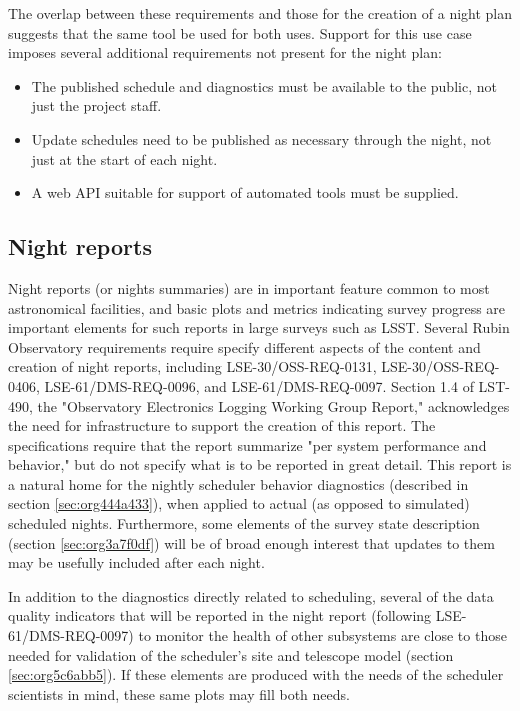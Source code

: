The overlap between these requirements and those for the creation of a night plan suggests that the same tool be used for both uses. 
Support for this use case imposes several additional requirements not present for the night plan:
\begin{itemize}
\item The published schedule and diagnostics must be available to the public, not just the project staff.
\item Update schedules need to be published as necessary through the night, not just at the start of each night.
\item A web API suitable for support of automated tools must be supplied.
\end{itemize}

\subsection{Night reports}
\label{sec:orgfa64fd4}
Night reports (or nights summaries) are in important feature common to most astronomical facilities, and basic plots and metrics indicating survey progress are important elements for such reports in large surveys such as LSST.
Several Rubin Observatory requirements require specify different aspects of the content and creation of night reports, including LSE-30/OSS-REQ-0131, LSE-30/OSS-REQ-0406, LSE-61/DMS-REQ-0096, and LSE-61/DMS-REQ-0097. Section 1.4 of LST-490, the "Observatory Electronics Logging Working Group Report," acknowledges the need for infrastructure to support the creation of this report.
The specifications require that the report summarize "per system performance and behavior," but do not specify what is to be reported in great detail.
This report is a natural home for the nightly scheduler behavior diagnostics (described in section \ref{sec:org444a433}), when applied to actual (as opposed to simulated) scheduled nights.
Furthermore, some elements of the survey state description (section \ref{sec:org3a7f0df}) will be of broad enough interest that updates to them may be usefully included after each night.

In addition to the diagnostics directly related to scheduling, several of the data quality indicators that will be reported in the night report (following LSE-61/DMS-REQ-0097) to monitor the health of other subsystems are close to those needed for validation of the scheduler's site and telescope model (section \ref{sec:org5c6abb5}). If these elements are produced with the needs of the scheduler scientists in mind, these same plots may fill both needs.

